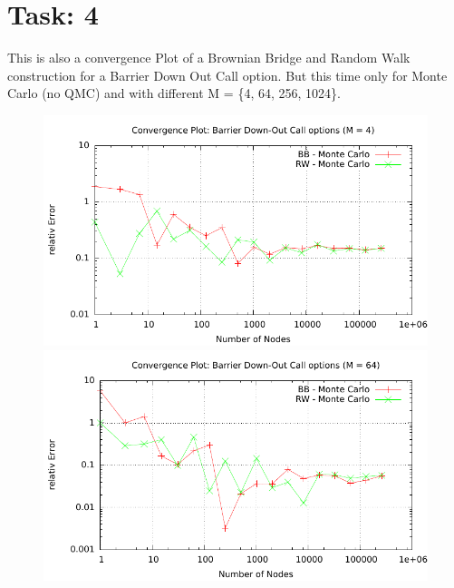 \documentclass{article}
\begin{document}
\section*{Task: 4}
This is also a convergence Plot of a Brownian Bridge and Random Walk construction for a Barrier Down Out Call option. But this time only for Monte Carlo (no QMC) and with different M = \{4, 64, 256, 1024\}.
 \begin{figure}[htbp]
	\begin{minipage}[b]{0.5\textwidth}
      \includegraphics[width=1.0\textwidth]{../Task04/sh4_task04_convergencePlot_M=4.pdf}
    \end{minipage}
	\begin{minipage}[b]{0.5\textwidth}
   	\includegraphics[width=1.0\textwidth]{../Task04/sh4_task04_convergencePlot_M=64.pdf}	
    \end{minipage}
  \end{figure}
\end{document}
